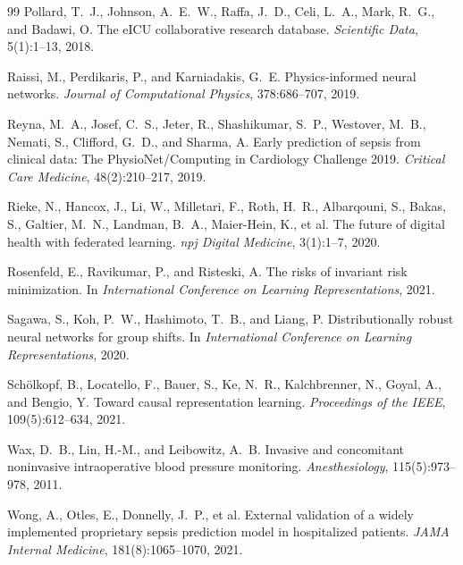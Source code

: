 \documentclass{article}
\begin{document}
{\begin{thebibliography}{99}
Pollard, T.~J., Johnson, A.~E.~W., Raffa, J.~D., Celi, L.~A., Mark, R.~G., and Badawi, O.
\newblock The eICU collaborative research database.
\newblock \emph{Scientific Data}, 5(1):1--13, 2018.

Raissi, M., Perdikaris, P., and Karniadakis, G.~E.
\newblock Physics-informed neural networks.
\newblock \emph{Journal of Computational Physics}, 378:686--707, 2019.

Reyna, M.~A., Josef, C.~S., Jeter, R., Shashikumar, S.~P., Westover, M.~B., Nemati, S., Clifford, G.~D., and Sharma, A.
\newblock Early prediction of sepsis from clinical data: The PhysioNet/Computing in Cardiology Challenge 2019.
\newblock \emph{Critical Care Medicine}, 48(2):210--217, 2019.

Rieke, N., Hancox, J., Li, W., Milletari, F., Roth, H.~R., Albarqouni, S., Bakas, S., Galtier, M.~N., Landman, B.~A., Maier-Hein, K., et al.
\newblock The future of digital health with federated learning.
\newblock \emph{npj Digital Medicine}, 3(1):1--7, 2020.

Rosenfeld, E., Ravikumar, P., and Risteski, A.
\newblock The risks of invariant risk minimization.
\newblock In \emph{International Conference on Learning Representations}, 2021.

Sagawa, S., Koh, P.~W., Hashimoto, T.~B., and Liang, P.
\newblock Distributionally robust neural networks for group shifts.
\newblock In \emph{International Conference on Learning Representations}, 2020.

Sch\"{o}lkopf, B., Locatello, F., Bauer, S., Ke, N.~R., Kalchbrenner, N., Goyal, A., and Bengio, Y.
\newblock Toward causal representation learning.
\newblock \emph{Proceedings of the IEEE}, 109(5):612--634, 2021.

Wax, D.~B., Lin, H.-M., and Leibowitz, A.~B.
\newblock Invasive and concomitant noninvasive intraoperative blood pressure monitoring.
\newblock \emph{Anesthesiology}, 115(5):973--978, 2011.

Wong, A., Otles, E., Donnelly, J.~P., et al.
\newblock External validation of a widely implemented proprietary sepsis prediction model in hospitalized patients.
\newblock \emph{JAMA Internal Medicine}, 181(8):1065--1070, 2021.


\end{thebibliography}}
\end{document}
